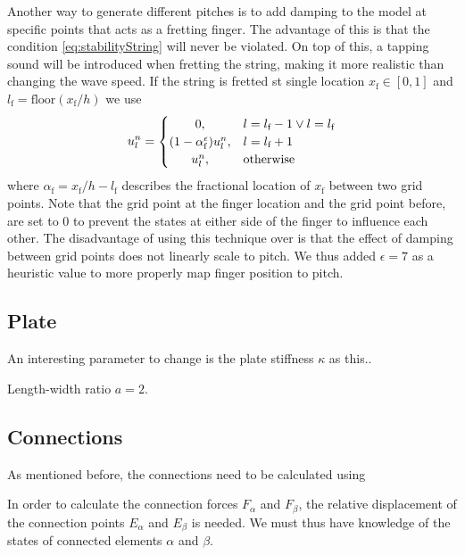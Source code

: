 \documentclass{article}
\begin{document}
Another way to generate different pitches is to add damping to the model at specific points that acts as a fretting finger. The advantage of this is that the condition \eqref{eq:stabilityString} will never be violated. On top of this, a tapping sound will be introduced when fretting the string, making it more realistic than changing the wave speed. If the string is fretted st single location $x_\text{f} \in [0, 1]$ and $l_\text{f} = \text{floor}(x_\text{f}/h)$ we use
\begin{equation}
u_l^n = 
    \begin{cases}
        \hfil 0, & l = l_\text{f} - 1 \vee l = l_\text{f}\\
        \hfil (1-\alpha_\text{f}^\epsilon) u_l^n, & l = l_\text{f} + 1\\
        \hfil u_l^n, & \text{otherwise}
    \end{cases}
\end{equation}
where $\alpha_\text{f} = x_\text{f}/h - l_\text{f}$ describes the fractional location of $x_\text{f}$ between two grid points. Note that the grid point at the finger location and the grid point before, are set to 0 to prevent the states at either side of the finger to influence each other. The disadvantage of using this technique over is that the effect of damping between grid points does not linearly scale to pitch. We thus added $\epsilon = 7$ as a heuristic value to more properly map finger position to pitch.

\subsection{Plate}
An interesting parameter to change is the plate stiffness $\kappa$ as this..

Length-width ratio $a = 2$. 

\subsection{Connections}
As mentioned before, the connections need to be calculated using 

In order to calculate the connection forces $F_\alpha$ and $F_\beta$, the relative displacement of the connection points $E_\alpha$ and $E_\beta$ is needed. We must thus have knowledge of the states of connected elements $\alpha$ and $\beta$. 
\end{document}

